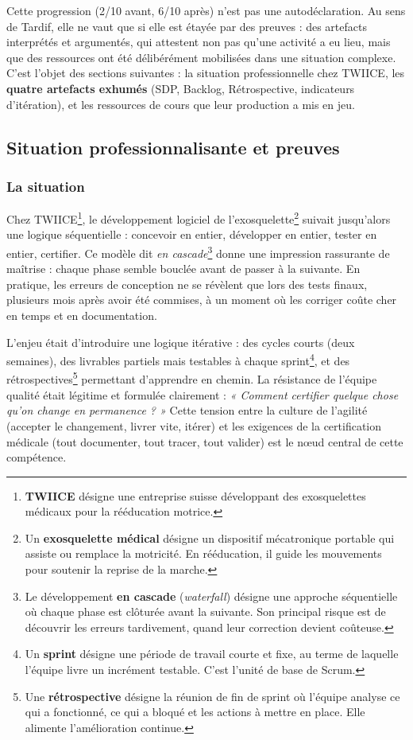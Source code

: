 Cette progression (2/10 avant, 6/10 après) n'est pas une autodéclaration. Au sens de Tardif, elle ne vaut que si elle est étayée par des preuves : des artefacts interprétés et argumentés, qui attestent non pas qu'une activité a eu lieu, mais que des ressources ont été délibérément mobilisées dans une situation complexe. C'est l'objet des sections suivantes : la situation professionnelle chez TWIICE, les \textbf{quatre artefacts exhumés} (SDP, Backlog, Rétrospective, indicateurs d'itération), et les ressources de cours que leur production a mis en jeu.

\subsection{Situation professionnalisante et preuves}

\subsubsection*{La situation}

Chez TWIICE\footnote{\textbf{TWIICE} désigne une entreprise suisse développant des exosquelettes médicaux pour la rééducation motrice.}, le développement logiciel de l'exosquelette\footnote{Un \textbf{exosquelette médical} désigne un dispositif mécatronique portable qui assiste ou remplace la motricité. En rééducation, il guide les mouvements pour soutenir la reprise de la marche.} suivait jusqu'alors une logique séquentielle : concevoir en entier, développer en entier, tester en entier, certifier. Ce modèle dit \emph{en cascade}\footnote{Le développement \textbf{en cascade} (\emph{waterfall}) désigne une approche séquentielle où chaque phase est clôturée avant la suivante. Son principal risque est de découvrir les erreurs tardivement, quand leur correction devient coûteuse.} donne une impression rassurante de maîtrise : chaque phase semble bouclée avant de passer à la suivante. En pratique, les erreurs de conception ne se révèlent que lors des tests finaux, plusieurs mois après avoir été commises, à un moment où les corriger coûte cher en temps et en documentation.

L'enjeu était d'introduire une logique itérative : des cycles courts (deux semaines), des livrables partiels mais testables à chaque sprint\footnote{Un \textbf{sprint} désigne une période de travail courte et fixe, au terme de laquelle l'équipe livre un incrément testable. C'est l'unité de base de Scrum.}, et des rétrospectives\footnote{Une \textbf{rétrospective} désigne la réunion de fin de sprint où l'équipe analyse ce qui a fonctionné, ce qui a bloqué et les actions à mettre en place. Elle alimente l'amélioration continue.} permettant d'apprendre en chemin. La résistance de l'équipe qualité était légitime et formulée clairement : \emph{« Comment certifier quelque chose qu'on change en permanence ? »} Cette tension entre la culture de l'agilité (accepter le changement, livrer vite, itérer) et les exigences de la certification médicale (tout documenter, tout tracer, tout valider) est le nœud central de cette compétence.

